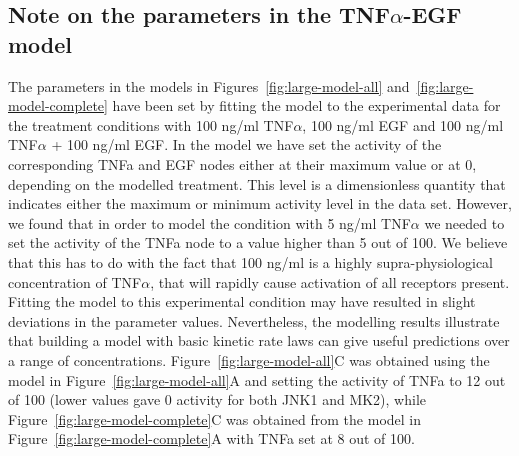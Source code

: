 \documentclass{bmcart}
\begin{document}
\subsection{Note on the parameters in the TNF$\alpha$-EGF model}\label{suppl:parameters-tnf-egf}
The parameters in the models in Figures~\ref{fig:large-model-all} and~\ref{fig:large-model-complete}
have been set by fitting the model to the experimental data for the treatment conditions with 100 ng/ml TNF$\alpha$, 
100 ng/ml EGF and 100 ng/ml TNF$\alpha$ + 100 ng/ml EGF.
In the model we have set the activity of the corresponding {\sf TNFa} and {\sf EGF} nodes either at
their maximum value or at 0, depending on the modelled treatment.
This level is a dimensionless quantity that indicates either the maximum or minimum activity level in the data set.
However, we found that in order to model the condition with 5 ng/ml TNF$\alpha$
we needed to set the activity of the {\sf TNFa} node to a value higher than 5 out of 100. 
We believe that this has to do with the fact that
100 ng/ml is a highly supra-physiological concentration of TNF$\alpha$, that will rapidly cause activation of all
receptors present. Fitting the model to this experimental condition may have resulted in slight deviations
in the parameter values. Nevertheless, the modelling results illustrate that building a model with basic
kinetic rate laws can give useful predictions over a range of concentrations.
Figure~\ref{fig:large-model-all}C was obtained using the model
in Figure~\ref{fig:large-model-all}A and setting the activity of {\sf TNFa} to 12 out of 100 (lower
values gave 0 activity for both JNK1 and MK2),
while Figure~\ref{fig:large-model-complete}C was obtained from the model in Figure~\ref{fig:large-model-complete}A
with {\sf TNFa} set at 8 out of 100.
\end{document}
